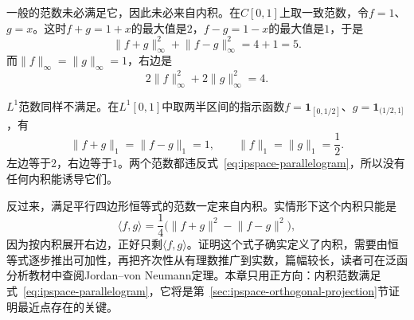 一般的范数未必满足它，因此未必来自内积。在$C[0,1]$上取一致范数，令$f=1$、$g=x$。这时$f+g=1+x$的最大值是$2$，$f-g=1-x$的最大值是$1$，于是
\[
 \lVert f+g\rVert_\infty^2+\lVert f-g\rVert_\infty^2=4+1=5 .
\]
而$\lVert f\rVert_\infty=\lVert g\rVert_\infty=1$，右边是
\[
 2\lVert f\rVert_\infty^2+2\lVert g\rVert_\infty^2=4 .
\]

$L^1$范数同样不满足。在$L^1[0,1]$中取两半区间的指示函数$f=\mathbf 1_{[0,1/2]}$、$g=\mathbf 1_{(1/2,1]}$，有
\[
 \lVert f+g\rVert_1=\lVert f-g\rVert_1=1,\qquad \lVert f\rVert_1=\lVert g\rVert_1=\frac12 .
\]
左边等于$2$，右边等于$1$。两个范数都违反式~\eqref{eq:ipspace-parallelogram}，所以没有任何内积能诱导它们。

反过来，满足平行四边形恒等式的范数一定来自内积。实情形下这个内积只能是
\begin{equation}
 \langle f,g\rangle=\frac14\bigl(\lVert f+g\rVert^2-\lVert f-g\rVert^2\bigr) ,
 \label{eq:ipspace-polarization}
\end{equation}
因为按内积展开右边，正好只剩$\langle f,g\rangle$。证明这个式子确实定义了内积，需要由恒等式逐步推出可加性，再把齐次性从有理数推广到实数，篇幅较长，读者可在泛函分析教材中查阅Jordan--von Neumann定理。本章只用正方向：内积范数满足式~\eqref{eq:ipspace-parallelogram}，它将是第~\ref{sec:ipspace-orthogonal-projection}节证明最近点存在的关键。
